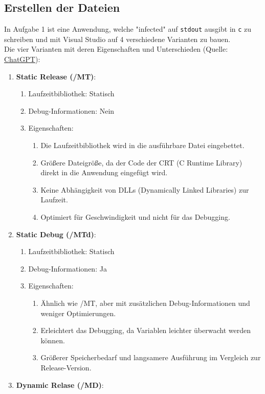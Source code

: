 \documentclass{article}
\begin{document}
	\subsection*{Erstellen der Dateien}
	In Aufgabe 1 ist eine Anwendung, welche "infected" auf \texttt{stdout} ausgibt in \texttt{c} zu schreiben und mit Visual Studio auf 4 verschiedene Varianten zu bauen.\\
	Die vier Varianten mit deren Eigenschaften und Unterschieden (Quelle: \href{https://chat.openai.com}{ChatGPT}):\\
	\begin{enumerate}
		\item \textbf{Static Release (/MT)}:
		\begin{enumerate}
			\item Laufzeitbibliothek: Statisch
			\item Debug-Informationen: Nein
			\item Eigenschaften:
			\begin{enumerate}
				\item Die Laufzeitbibliothek wird in die ausführbare Datei eingebettet.
				\item Größere Dateigröße, da der Code der CRT (C Runtime Library) direkt in die Anwendung eingefügt wird.
				\item Keine Abhängigkeit von DLLs (Dynamically Linked Libraries) zur Laufzeit.
				\item Optimiert für Geschwindigkeit und nicht für das Debugging.
			\end{enumerate}
		\end{enumerate}
		\item \textbf{Static Debug (/MTd)}:
		\begin{enumerate}
			\item Laufzeitbibliothek: Statisch
			\item Debug-Informationen: Ja
			\item Eigenschaften:
			\begin{enumerate}
				\item Ähnlich wie /MT, aber mit zusätzlichen Debug-Informationen und weniger Optimierungen.
				\item Erleichtert das Debugging, da Variablen leichter überwacht werden können.
				\item Größerer Speicherbedarf und langsamere Ausführung im Vergleich zur Release-Version.
			\end{enumerate}
		\end{enumerate}
		\item \textbf{Dynamic Relase (/MD)}:

\end{enumerate}
\end{document}
